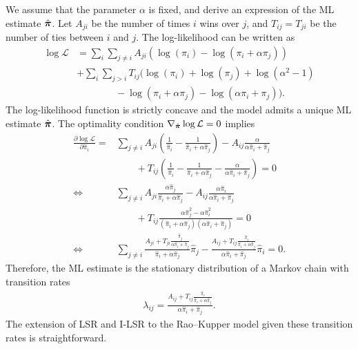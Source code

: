 We assume that the parameter $\alpha$ is fixed, and derive an expression of the ML estimate $\hat{\bm{\pi}}$.
Let $A_{ji}$ be the number of times $i$ wins over $j$, and $T_{ij} = T_{ji}$ be the number of ties between $i$ and $j$.
The log-likelihood can be written as
\begin{align}
\log \mathcal{L} &=
  \sum_i \sum_{j \ne i}
  A_{ji} \left( \log(\pi_i) - \log(\pi_i + \alpha \pi_j) \right) \\
    &+ \sum_i \sum_{j > i} \nonumber
    T_{ij} ( \log(\pi_i) + \log(\pi_j) + \log(\alpha^2 - 1) \\
    & \qquad \qquad {} - \log(\pi_i + \alpha \pi_j) - \log(\alpha \pi_i + \pi_j) ). \nonumber
\end{align}
The log-likelihood function is strictly concave and the model admits a unique ML estimate $\hat{\bm{\pi}}$.
The optimality condition $\nabla_{\hat{\bm{\pi}}} \log \mathcal{L} = 0$ implies
\begin{align}
  \frac{\partial \log \mathcal{L}}{\partial \hat{\pi}_i}
  = &\sum_{j \ne i} A_{ji} \left( \frac{1}{\hat{\pi}_i} - \frac{1}{\hat{\pi}_i + \alpha \hat{\pi}_j} \right)
    - A_{ij} \frac{\alpha}{\alpha \hat{\pi}_i + \hat{\pi}_j} \\
  & \qquad {} + T_{ij} \left( \frac{1}{\hat{\pi}_i} - \frac{1}{\hat{\pi}_i + \alpha \hat{\pi}_j} - \frac{\alpha}{\alpha \hat{\pi}_i + \hat{\pi}_j}\right) = 0 \\
  \iff & \sum_{j \ne i} A_{ji} \frac{\alpha \hat{\pi}_j}{\hat{\pi}_i + \alpha \hat{\pi}_j}
    - A_{ij} \frac{\alpha \hat{\pi}_i}{\alpha \hat{\pi}_i + \hat{\pi}_j} \\
  & \qquad {} + T_{ij} \frac{\alpha \hat{\pi}_j^2 - \alpha \hat{\pi}_i^2}{(\hat{\pi}_i + \alpha \hat{\pi}_j)(\alpha \hat{\pi}_i + \hat{\pi}_j)} = 0 \\
  \iff & \sum_{j \ne i} \frac{A_{ji} + T_{ji}\tfrac{\hat{\pi}_j}{\alpha \hat{\pi}_i + \hat{\pi}_j}}{\hat{\pi}_i + \alpha \hat{\pi}_j} \hat{\pi}_j
    - \frac{A_{ij} + T_{ij}\tfrac{\hat{\pi}_i}{\hat{\pi}_i + \alpha \hat{\pi}_j}}{\alpha \hat{\pi}_i + \hat{\pi}_j} \hat{\pi}_i = 0.
\end{align}
Therefore, the ML estimate is the stationary distribution of a Markov chain with transition rates
\begin{align}
\lambda_{ij} = \frac{A_{ij} + T_{ij}\tfrac{\hat{\pi}_i}{\hat{\pi}_i + \alpha \hat{\pi}_j}}{\alpha \hat{\pi}_i + \hat{\pi}_j}.
\end{align}
The extension of LSR and I-LSR to the Rao--Kupper model given these transition rates is straightforward.



